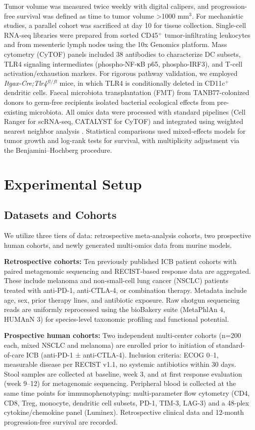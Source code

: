 \documentclass{article}
\begin{document}
Tumor volume was measured twice weekly with digital calipers, and progression-free survival was defined as time to tumor volume >1000 mm$^3$. For mechanistic studies, a parallel cohort was sacrificed at day 10 for tissue collection. Single-cell RNA-seq libraries were prepared from sorted CD45$^+$ tumor-infiltrating leukocytes and from mesenteric lymph nodes using the 10x Genomics platform. Mass cytometry (CyTOF) panels included 38 antibodies to characterize DC subsets, TLR4 signaling intermediates (phospho-NF-κB p65, phospho-IRF3), and T-cell activation/exhaustion markers. For rigorous pathway validation, we employed \textit{Itgax-Cre;Tlr4$^{fl/fl}$} mice, in which TLR4 is conditionally deleted in CD11c$^+$ dendritic cells. Faecal microbiota transplantation (FMT) from TANB77-colonized donors to germ-free recipients isolated bacterial ecological effects from pre-existing microbiota. All omics data were processed with standard pipelines (Cell Ranger for scRNA-seq, CATALYST for CyTOF) and integrated using weighted nearest neighbor analysis \cite{hao_integrated_analysis_2021}. Statistical comparisons used mixed-effects models for tumor growth and log-rank tests for survival, with multiplicity adjustment via the Benjamini–Hochberg procedure.

\section{Experimental Setup}

\subsection{Datasets and Cohorts}
We utilize three tiers of data: retrospective meta-analysis cohorts, two prospective human cohorts, and newly generated multi-omics data from murine models.

\textbf{Retrospective cohorts:} Ten previously published ICB patient cohorts with paired metagenomic sequencing and RECIST-based response data are aggregated. These include melanoma and non-small-cell lung cancer (NSCLC) patients treated with anti-PD-1, anti-CTLA-4, or combination therapy. Metadata include age, sex, prior therapy lines, and antibiotic exposure. Raw shotgun sequencing reads are uniformly reprocessed using the bioBakery suite (MetaPhlAn 4, HUMAnN 3) for species-level taxonomic profiling and functional potential.

\textbf{Prospective human cohorts:} Two independent multi-center cohorts (n=200 each, mixed NSCLC and melanoma) are enrolled prior to initiation of standard-of-care ICB (anti-PD-1 ± anti-CTLA-4). Inclusion criteria: ECOG 0--1, measurable disease per RECIST v1.1, no systemic antibiotics within 30 days. Stool samples are collected at baseline, week 3, and at first response evaluation (week 9--12) for metagenomic sequencing. Peripheral blood is collected at the same time points for immunophenotyping: multi-parameter flow cytometry (CD4, CD8, Treg, monocyte, dendritic cell subsets, PD-1, TIM-3, LAG-3) and a 48-plex cytokine/chemokine panel (Luminex). Retrospective clinical data and 12-month progression-free survival are recorded.
\end{document}
